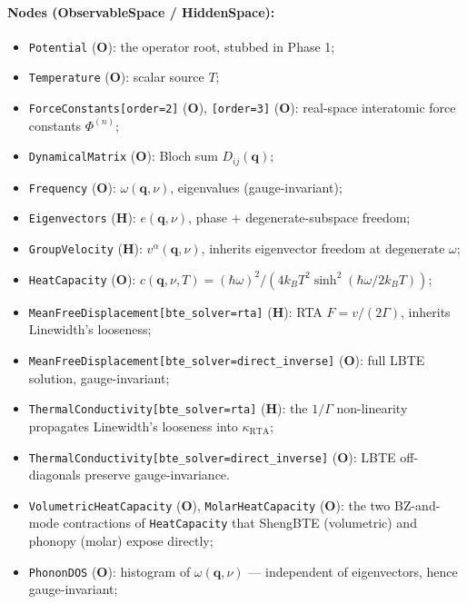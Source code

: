 \documentclass[11pt,a4paper]{article}
\begin{document}
\paragraph{Nodes (ObservableSpace / HiddenSpace):}
\begin{itemize}[leftmargin=2em, itemsep=0.2em]
  \item \texttt{Potential} (\textbf{O}): the operator root, stubbed in Phase 1;
  \item \texttt{Temperature} (\textbf{O}): scalar source $T$;
  \item \texttt{ForceConstants[order=2]} (\textbf{O}), \texttt{[order=3]} (\textbf{O}):
        real-space interatomic force constants $\Phi^{(n)}$;
  \item \texttt{DynamicalMatrix} (\textbf{O}): Bloch sum $D_{ij}(\mathbf{q})$;
  \item \texttt{Frequency} (\textbf{O}): $\omega(\mathbf{q},\nu)$, eigenvalues
        (gauge-invariant);
  \item \texttt{Eigenvectors} (\textbf{H}): $e(\mathbf{q},\nu)$, phase $+$
        degenerate-subspace freedom;
  \item \texttt{GroupVelocity} (\textbf{H}): $v^\alpha(\mathbf{q},\nu)$, inherits
        eigenvector freedom at degenerate $\omega$;
  \item \texttt{HeatCapacity} (\textbf{O}): $c(\mathbf{q},\nu, T) = (\hbar\omega)^2 /
        (4 k_B T^2 \sinh^2(\hbar\omega / 2 k_B T))$;
  \item \texttt{MeanFreeDisplacement[bte\_solver=rta]} (\textbf{H}): RTA
        $F = v/(2\Gamma)$, inherits Linewidth's looseness;
  \item \texttt{MeanFreeDisplacement[bte\_solver=direct\_inverse]} (\textbf{O}): full
        LBTE solution, gauge-invariant;
  \item \texttt{ThermalConductivity[bte\_solver=rta]} (\textbf{H}): the $1/\Gamma$
        non-linearity propagates Linewidth's looseness into $\kappa_\text{RTA}$;
  \item \texttt{ThermalConductivity[bte\_solver=direct\_inverse]} (\textbf{O}):
        LBTE off-diagonals preserve gauge-invariance.
  \item \texttt{VolumetricHeatCapacity} (\textbf{O}), \texttt{MolarHeatCapacity}
        (\textbf{O}): the two BZ-and-mode contractions of \texttt{HeatCapacity}
        that ShengBTE (volumetric) and phonopy (molar) expose directly;
  \item \texttt{PhononDOS} (\textbf{O}): histogram of $\omega(\mathbf{q},\nu)$
        --- independent of eigenvectors, hence gauge-invariant;

\end{itemize}
\end{document}
